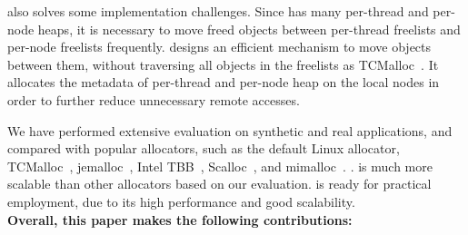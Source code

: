  
\NM{} also solves some implementation challenges. Since \NM{} has many per-thread and per-node heaps, it is necessary to move freed objects between per-thread freelists and per-node freelists frequently. \NM{} designs an efficient mechanism to move objects between them, without traversing all objects in the freelists as TCMalloc~\citep{tcmalloc}. It allocates the metadata of per-thread and per-node heap on the local nodes in order to further reduce unnecessary remote accesses.  


We have performed extensive evaluation on synthetic and real applications, and compared \NM{} with popular allocators, such as the default Linux allocator, TCMalloc~\citep{tcmalloc}, jemalloc~\citep{jemalloc}, Intel TBB~\citep{tbb}, Scalloc~\citep{Scalloc}, and mimalloc~\citep{mimalloc}. . \NM{} is much more scalable than other allocators based on our evaluation. \NM{} is ready for practical employment, due to its high performance and good scalability. \\

\textbf{Overall, this paper makes the following contributions:} 

